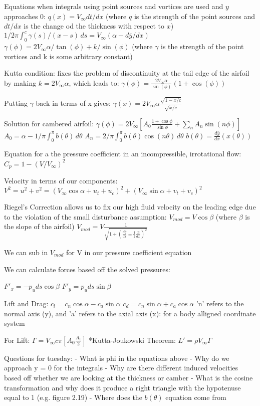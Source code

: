 \documentclass[12pt, letterpaper]{article}
\begin{document}
Equations when integrals using point sources and vortices are used and $y$ approaches $0$:
$q(x)=V_\infty dt/dx$ (where $q$ is the strength of the point sources and $dt/dx$ is the change od the thickness with respect to $x$)
$1/2\pi \int_{0}^{c} \gamma(s)/(x-s) \,ds = V_\infty (\alpha - d\bar{y}/dx)$
$\gamma(\phi) = 2V_\infty\alpha/\tan(\phi) + k/\sin(\phi)$ (where $\gamma$ is the strength of the point vortices and k is some arbitrary constant)

Kutta condition: fixes the problem of discontinuity at the tail edge of the airfoil by making $k = 2V_\infty\alpha$, which leads to:
$\gamma(\phi) = \frac{2V_\infty\alpha}{\sin(\phi)} (1+\cos(\phi))$

Putting $\gamma$ back in terms of x gives:
$\gamma(x) = 2V_\infty\alpha\frac{\sqrt{1-x/c}}{\sqrt{x/c}}$

Solution for cambered airfoil:
$\gamma(\phi) = 2V_\infty[A_0\frac{1+\cos\phi}{\sin\phi}+\sum_{n} A_n\sin(n\phi)]$
$A_0 = \alpha-1/\pi\int_{0}^{\pi} b(\theta)\, d\theta$
$A_n = 2/\pi\int_{0}^{\pi} b(\theta)\cos(n\theta)\, d\theta$
$b(\theta) = \frac{d\bar{y}}{dx}(x(\theta))$

Equation for a the pressure coefficient in an incompressible, irrotational flow:
$C_p = 1-(V/V_\infty)^2$

Velocity in terms of our components:
$V^2=u^2+v^2=(V_\infty\cos\alpha+u_t+u_c)^2+(V_\infty\sin\alpha+v_t+v_c)^2$ 

Riegel's Correction allows us to fix our high fluid velocity on the leading edge due to the violation of the small disturbance assumption:
$V_{mod}= V\cos\beta$ (where $\beta$ is the slope of the airfoil)
$V_{mod} = V\frac{1}{\sqrt{1+(\frac{d\bar{y}}{dx}\pm\frac{1}{2}\frac{dt}{dx})^2}}$

We can sub in $V_{mod}$ for V in our pressure coefficient equation

We can calculate forces based off the solved pressures:

$F'_x = -p_{u}ds\cos\beta$
$F'_y = p_{u}ds\sin\beta$

Lift and Drag:
$c_l=c_n\cos\alpha -c_a\sin\alpha$
$c_d = c_n\sin\alpha + c_a\cos\alpha$
'n' refers to the normal axis (y), and 'a' refers to the axial axis (x): for a body alligned coordinate system

For Lift:
$\Gamma=V_\infty c\pi[A_0 \frac{A_1}{2}]$
*Kutta-Joukowski Theorem:
$L'=\rho V_\infty \Gamma$

Questions for tuesday:
- What is phi in the equations above
- Why do we approach y = 0 for the integrals
- Why are there different induced velocities based off whether we are looking at the thickness or camber 
- What is the cosine transformation and why does it produce a right triangle with the hypotenuse equal to 1 (e.g. figure 2.19)
- Where does the $b(\theta)$ equation come from
\end{document}
